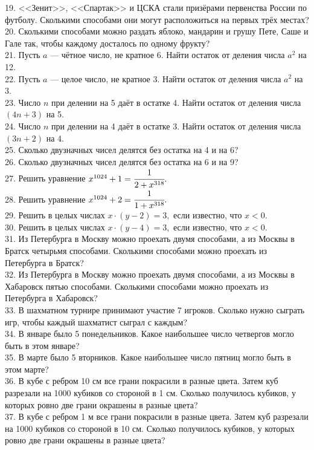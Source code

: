 19. <<Зенит>>, <<Спартак>> и ЦСКА стали призёрами первенства России по футболу. Сколькими способами они могут расположиться на первых трёх местах?\\
20. Сколькими способами можно раздать яблоко, мандарин и грушу Пете, Саше и Гале так, чтобы каждому досталось по одному фрукту?\\
21. Пусть $a$ --- чётное число, не кратное 6. Найти остаток от деления числа $a^2$ на 12.\\
22. Пусть $a$ --- целое число, не кратное 3. Найти остаток от деления числа $a^2$ на 3.\\
23. Число $n$ при делении на 5 даёт в остатке 4. Найти остаток от деления числа $(4n+3)$ на 5.\\
24. Число $n$ при делении на 4 даёт в остатке 3. Найти остаток от деления числа $(3n+2)$ на 4.\\
25. Сколько двузначных чисел делятся без остатка на 4 и на 6?\\
26. Сколько двузначных чисел делятся без остатка на 6 и на 9?\\
27. Решить уравнение $x^{1024}+1=\cfrac{1}{2+x^{318}}.$\\
28. Решить уравнение $x^{1024}+2=\cfrac{1}{1+x^{318}}.$\\
29. Решить в целых числах $x\cdot (y-2)=3,$ если известно, что $x<0.$\\
30. Решить в целых числах $x\cdot (y-4)=3,$ если известно, что $x<0.$\\
31. Из Петербурга в Москву можно проехать двумя способами, а из Москвы в Братск четырьмя способами. Сколькими способами можно проехать из Петербурга в Братск?\\
32. Из Петербурга в Москву можно проехать двумя способами, а из Москвы в Хабаровск пятью способами. Сколькими способами можно проехать из Петербурга в Хабаровск?\\
33. В шахматном турнире принимают участие 7 игроков. Сколько нужно сыграть игр, чтобы каждый шахматист сыграл с каждым?\\
34. В январе было 5 понедельников. Какое наибольшее число четвергов могло быть в этом январе?\\
35. В марте было 5 вторников. Какое наибольшее число пятниц могло быть в этом марте?\\
36. В кубе с ребром 10 см все грани покрасили в разные цвета. Затем куб разрезали на 1000 кубиков со стороной в 1 см. Сколько получилось кубиков, у которых ровно две грани окрашены в разные цвета?\\
37. В кубе с ребром 1 м все грани покрасили в разные цвета. Затем куб разрезали на 1000 кубиков со стороной в 10 см. Сколько получилось кубиков, у которых ровно две грани окрашены в разные цвета?\\
